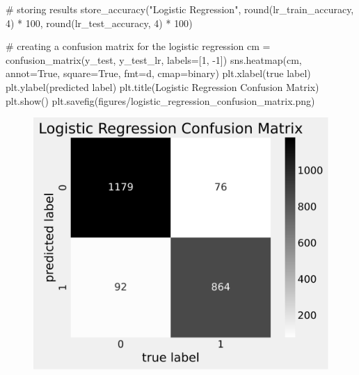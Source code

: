\documentclass[
  letterpaper,
  DIV=11,
  numbers=noendperiod]{scrartcl}
\newenvironment{Shaded}{\begin{snugshade}}{\end{snugshade}}
\newcommand{\BuiltInTok}[1]{\textcolor[rgb]{0.00,0.23,0.31}{#1}}
\newcommand{\CommentTok}[1]{\textcolor[rgb]{0.37,0.37,0.37}{#1}}
\newcommand{\DecValTok}[1]{\textcolor[rgb]{0.68,0.00,0.00}{#1}}
\newcommand{\NormalTok}[1]{\textcolor[rgb]{0.00,0.23,0.31}{#1}}
\newcommand{\OperatorTok}[1]{\textcolor[rgb]{0.37,0.37,0.37}{#1}}
\newcommand{\StringTok}[1]{\textcolor[rgb]{0.13,0.47,0.30}{#1}}
\newcommand{\VariableTok}[1]{\textcolor[rgb]{0.07,0.07,0.07}{#1}}
\begin{document}
\begin{Shaded}
\begin{Highlighting}[]
\CommentTok{\# storing results}
\NormalTok{store\_accuracy(}\StringTok{"Logistic Regression"}\NormalTok{, }\BuiltInTok{round}\NormalTok{(lr\_train\_accuracy, }\DecValTok{4}\NormalTok{) }\OperatorTok{*} \DecValTok{100}\NormalTok{, }\BuiltInTok{round}\NormalTok{(lr\_test\_accuracy, }\DecValTok{4}\NormalTok{) }\OperatorTok{*} \DecValTok{100}\NormalTok{)}
\end{Highlighting}
\end{Shaded}

\begin{Shaded}
\begin{Highlighting}[]
\CommentTok{\# creating a confusion matrix for the logistic regression}
\NormalTok{cm }\OperatorTok{=}\NormalTok{ confusion\_matrix(y\_test, y\_test\_lr, labels}\OperatorTok{=}\NormalTok{[}\DecValTok{1}\NormalTok{, }\OperatorTok{{-}}\DecValTok{1}\NormalTok{])}
\NormalTok{sns.heatmap(cm, annot}\OperatorTok{=}\VariableTok{True}\NormalTok{, square}\OperatorTok{=}\VariableTok{True}\NormalTok{, fmt}\OperatorTok{=}\StringTok{\textquotesingle{}d\textquotesingle{}}\NormalTok{, cmap}\OperatorTok{=}\StringTok{\textquotesingle{}binary\textquotesingle{}}\NormalTok{)}
\NormalTok{plt.xlabel(}\StringTok{\textquotesingle{}true label\textquotesingle{}}\NormalTok{)}
\NormalTok{plt.ylabel(}\StringTok{\textquotesingle{}predicted label\textquotesingle{}}\NormalTok{)}
\NormalTok{plt.title(}\StringTok{\textquotesingle{}Logistic Regression Confusion Matrix\textquotesingle{}}\NormalTok{)}
\NormalTok{plt.show()}
\NormalTok{plt.savefig(}\StringTok{\textquotesingle{}figures/logistic\_regression\_confusion\_matrix.png\textquotesingle{}}\NormalTok{)}
\end{Highlighting}
\end{Shaded}

\begin{figure}[H]

{\centering \includegraphics{project_files/figure-pdf/cell-34-output-1.svg}

}

\end{figure}
\end{document}
